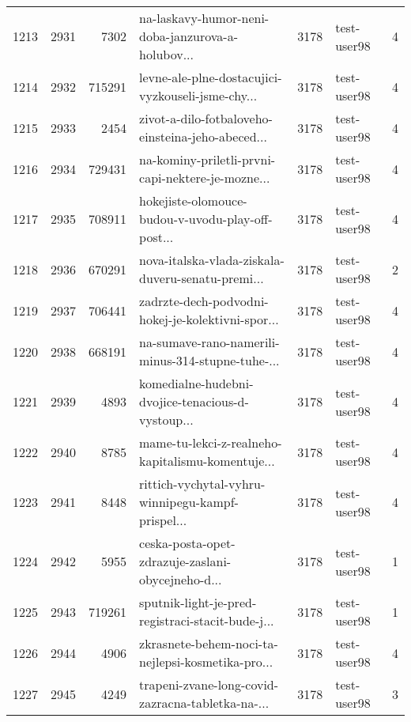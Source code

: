 \begin{tabular}{lrrlrlr}
1213 &       2931 &     7302 &  na-laskavy-humor-neni-doba-janzurova-a-holubov... &     3178 &                  test-user98 &               4 \\
1214 &       2932 &   715291 &  levne-ale-plne-dostacujici-vyzkouseli-jsme-chy... &     3178 &                  test-user98 &               4 \\
1215 &       2933 &     2454 &  zivot-a-dilo-fotbaloveho-einsteina-jeho-abeced... &     3178 &                  test-user98 &               4 \\
1216 &       2934 &   729431 &  na-kominy-priletli-prvni-capi-nektere-je-mozne... &     3178 &                  test-user98 &               4 \\
1217 &       2935 &   708911 &  hokejiste-olomouce-budou-v-uvodu-play-off-post... &     3178 &                  test-user98 &               4 \\
1218 &       2936 &   670291 &  nova-italska-vlada-ziskala-duveru-senatu-premi... &     3178 &                  test-user98 &               2 \\
1219 &       2937 &   706441 &  zadrzte-dech-podvodni-hokej-je-kolektivni-spor... &     3178 &                  test-user98 &               4 \\
1220 &       2938 &   668191 &  na-sumave-rano-namerili-minus-314-stupne-tuhe-... &     3178 &                  test-user98 &               4 \\
1221 &       2939 &     4893 &  komedialne-hudebni-dvojice-tenacious-d-vystoup... &     3178 &                  test-user98 &               4 \\
1222 &       2940 &     8785 &  mame-tu-lekci-z-realneho-kapitalismu-komentuje... &     3178 &                  test-user98 &               4 \\
1223 &       2941 &     8448 &  rittich-vychytal-vyhru-winnipegu-kampf-prispel... &     3178 &                  test-user98 &               4 \\
1224 &       2942 &     5955 &  ceska-posta-opet-zdrazuje-zaslani-obycejneho-d... &     3178 &                  test-user98 &               1 \\
1225 &       2943 &   719261 &  sputnik-light-je-pred-registraci-stacit-bude-j... &     3178 &                  test-user98 &               1 \\
1226 &       2944 &     4906 &  zkrasnete-behem-noci-ta-nejlepsi-kosmetika-pro... &     3178 &                  test-user98 &               4 \\
1227 &       2945 &     4249 &  trapeni-zvane-long-covid-zazracna-tabletka-na-... &     3178 &                  test-user98 &               3 \\

\end{tabular}
